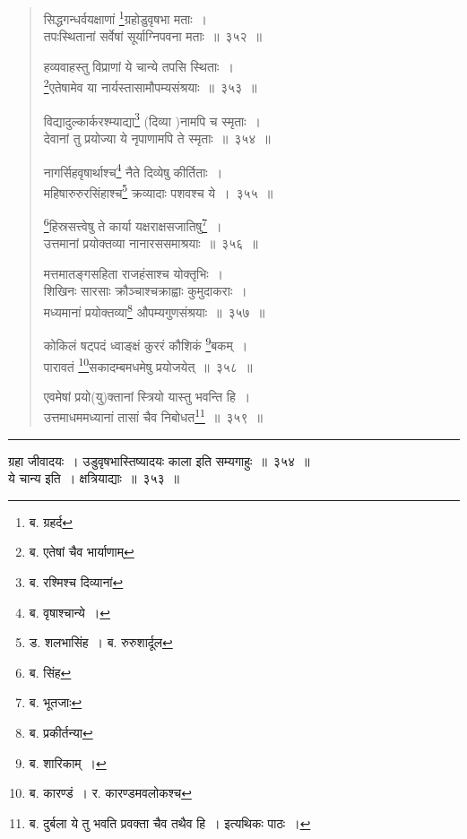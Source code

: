 \documentclass[11pt, openany]{book}
\begin{document}
\begin{quote}
{\na सिद्धगन्धर्वयक्षाणां \renewcommand{\thefootnote}{1}\footnote{ब. ग्रहर्द}ग्रहोडुवृषभा मताः~।\\
 तपःस्थितानां सर्वेषां सूर्याग्निपवना मताः~॥~३५२~॥

 हव्यवाहस्तु विप्राणां ये चान्ये तपसि स्थिताः~।\\
 \renewcommand{\thefootnote}{2}\footnote{ब. एतेषां चैव भार्याणाम्}एतेषामेव या नार्यस्तासामौपम्यसंश्रयाः~॥~३५३~॥

 विद्यादुल्कार्करश्म्याद्या\renewcommand{\thefootnote}{3}\footnote{ब. रश्मिश्च दिव्यानां} (दिव्या )नामपि च स्मृताः~।\\
 देवानां तु प्रयोज्या ये नृपाणामपि ते स्मृताः~॥~३५४~॥

 नागर्सिहवृषार्थाश्च\renewcommand{\thefootnote}{4}\footnote{ब. वृषाश्चान्ये~।} नैते दिव्येषु कीर्तिताः~।\\
 महिषारुरुरसिंहाश्च\renewcommand{\thefootnote}{5}\footnote{ड. शलभासिंह~। ब. रुरुशार्दूल} क्रव्यादाः पशवश्च ये~।~३५५~॥

 \renewcommand{\thefootnote}{6}\footnote{ब. सिंह}हिस्रसत्त्वेषु ते कार्या यक्षराक्षसजातिषु\renewcommand{\thefootnote}{7}\footnote{ब. भूतजाः}~।\\
 उत्तमानां प्रयोक्तव्या नानारससमाश्रयाः~॥~३५६~॥

 मत्तमातङ्गसहिता राजहंसाश्च योक्तृभिः~।\\
 शिखिनः सारसाः क्रौञ्चाश्चक्राह्वाः कुमुदाकराः~।\\
 मध्यमानां प्रयोक्तव्या\renewcommand{\thefootnote}{8}\footnote{ब. प्रकीर्तन्या} औपम्यगुणसंश्रयाः~॥~३५७~॥

 कोकिलं षट्पदं ध्वाङ्क्षं कुररं कौशिकं \renewcommand{\thefootnote}{9}\footnote{ब. शारिकाम्~।}बकम्~।\\
 पारावतं \renewcommand{\thefootnote}{10}\footnote{ब. कारण्डं~। र. कारण्डमवलोकश्च}सकादम्बमधमेषु प्रयोजयेत्~॥~३५८~॥

 एवमेषां प्रयो(यु)क्तानां स्त्रियो यास्तु भवन्ति हि~।\\
 उत्तमाधममध्यानां तासां चैव निबोधत\renewcommand{\thefootnote}{11}\footnote{ब. दुर्बला ये तु भवति प्रवक्ता चैव तथैव हि~। इत्यथिकः पाठः~।}~॥~३५९~॥}
\end{quote}

\hrule

\vspace{2mm}
{\qtt ग्रहा} जीवादयः~। उडुवृषभास्तिष्यादयः काला इति सम्यगाहुः~॥~३५४~॥\\

{\qtt ये चान्य} इति~। क्षत्रियाद्याः~॥~३५३~॥\\
\end{document}
